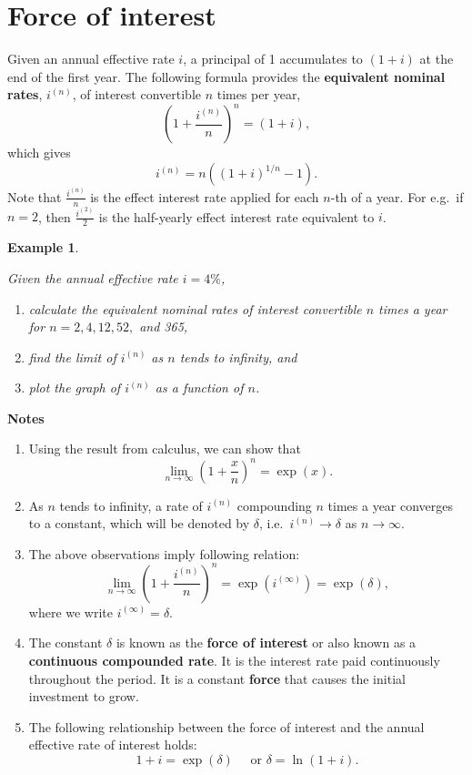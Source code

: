 \documentclass[landscape, 20pt]{extreport}
\theoremstyle{definition}
\theoremstyle{definition}
\newtheorem{example}{Example}[chapter]
\theoremstyle{definition}
\theoremstyle{definition}
\theoremstyle{remark}
\begin{document}
\hypertarget{force-of-interest}{%
\section{Force of interest}\label{force-of-interest}}

Given an annual effective rate \(i\), a principal of 1 accumulates to
\((1 + i)\) at the end of the first year. The following formula provides
the \textbf{equivalent nominal rates}, \(i^{(n)}\), of interest convertible \(n\)
times per year, \[\left(1 + \frac{i^{(n)}}{n} \right)^n  = (1 + i),\]
which gives \[i^{(n)} = n\left( (1+ i)^{1/n} - 1  \right).\] Note that
\(\displaystyle{\frac{i^{(n)}}{n}}\) is the effect interest rate applied
for each \(n\)-th of a year. For e.g.~if \(n =2\), then
\(\displaystyle{\frac{i^{(2)}}{2}}\) is the half-yearly effect interest
rate equivalent to \(i\).

\newpage \begin{example}
\protect\hypertarget{exm:unlabeled-div-58}{}\label{exm:unlabeled-div-58}

\emph{Given the annual effective rate \(i = 4\%\),}

\begin{enumerate}
\def\labelenumi{\arabic{enumi}.}
\item
  \emph{calculate the equivalent nominal rates of interest convertible \(n\)
  times a year for \(n = 2,4,12, 52,\) and 365,}
\item
  \emph{find the limit of \(i^{(n)}\) as \(n\) tends to infinity, and}
\item
  \emph{plot the graph of \(i^{(n)}\) as a function of \(n\).}
\end{enumerate}

\end{example}

\textbf{Notes}

\begin{enumerate}
\def\labelenumi{\arabic{enumi}.}
\item
  Using the result from calculus, we can show that
  \[\lim_{n \rightarrow \infty} \left(1 + \frac{x}{n} \right)^n = \exp(x).\]
\item
  As \(n\) tends to infinity, a rate of \(i^{(n)}\) compounding \(n\) times
  a year converges to a constant, which will be denoted by \(\delta\),
  i.e.~\(i^{(n)} \rightarrow \delta\) as \(n \rightarrow \infty\).
\item
  The above observations imply following relation:
  \[\lim_{n \rightarrow \infty} \left(1 + \frac{i^{(n)}}{n} \right)^n  = \exp(i^{(\infty)}) = \exp(\delta),\]
  where we write \(i^{(\infty)} = \delta\).
\item
  The constant \(\delta\) is known as the \textbf{force of interest} or also
  known as a \textbf{continuous compounded rate}. It is the interest rate
  paid continuously throughout the period. It is a constant \textbf{force}
  that causes the initial investment to grow.
\item
  The following relationship between the force of interest and the
  annual effective rate of interest holds:
  \[1 + i = \exp(\delta) \quad \text { or } \delta = \ln(1+i).\]
\end{enumerate}
\end{document}
